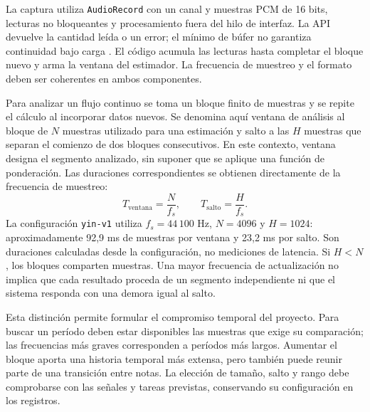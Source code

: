 La captura utiliza \texttt{AudioRecord} con un canal y muestras PCM de 16 bits,
lecturas no bloqueantes y procesamiento fuera del hilo de interfaz. La API devuelve
la cantidad leída o un error; el mínimo de búfer no garantiza continuidad bajo carga
\parencite{androidAudioRecord}. El código acumula las lecturas hasta completar el
bloque nuevo y arma la ventana del estimador. La frecuencia de muestreo y el formato
deben ser coherentes en ambos componentes.

\label{sec:ventanas-audio}
Para analizar un flujo continuo se toma un bloque finito de muestras y se repite
el cálculo al incorporar datos nuevos. Se denomina aquí ventana de análisis al
bloque de \(N\) muestras utilizado para una estimación y salto a las \(H\) muestras
que separan el comienzo de dos bloques consecutivos. En este contexto, ventana
designa el segmento analizado, sin suponer que se aplique una función de ponderación.
Las duraciones correspondientes se obtienen directamente de la frecuencia de
muestreo:
\begin{equation}
  T_{\mathrm{ventana}}=\frac{N}{f_s},\qquad
  T_{\mathrm{salto}}=\frac{H}{f_s}.
  \label{eq:ventana-salto}
\end{equation}
La configuración \texttt{yin-v1} utiliza \(f_s=44\,100\) Hz, \(N=4096\) y
\(H=1024\): aproximadamente 92,9 ms de muestras por ventana y 23,2 ms por salto.
Son duraciones calculadas desde la configuración, no mediciones de latencia.
Si \(H<N\), los bloques comparten muestras. Una mayor frecuencia de actualización
no implica que cada resultado proceda de un segmento independiente ni que el
sistema responda con una demora igual al salto.

Esta distinción permite formular el compromiso temporal del proyecto. Para
buscar un período deben estar disponibles las muestras que exige su comparación;
las frecuencias más graves corresponden a períodos más largos. Aumentar el bloque
aporta una historia temporal más extensa, pero también puede reunir parte de una
transición entre notas. La elección de tamaño, salto y rango debe comprobarse
con las señales y tareas previstas, conservando su configuración en los registros.


